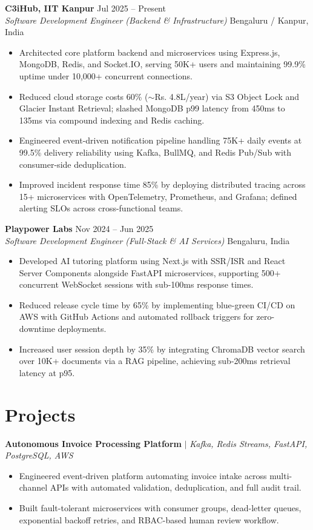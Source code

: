 \documentclass[10pt]{article}
\newcommand{\rItemList}{\begin{itemize}[leftmargin=1.1em, itemsep=0.8pt, topsep=0.8pt, parsep=0pt, label=\textbullet]}
\newcommand{\rEndItemList}{\end{itemize}}
\begin{document}
\textbf{C3iHub, IIT Kanpur} \hfill Jul 2025 -- Present \\
\textit{Software Development Engineer (Backend \& Infrastructure)} \hfill Bengaluru / Kanpur, India
\rItemList
\item Architected core platform backend and microservices using Express.js, MongoDB, Redis, and Socket.IO, serving 50K+ users and maintaining 99.9\% uptime under 10,000+ concurrent connections.
\item Reduced cloud storage costs 60\% ($\sim$Rs. 4.8L/year) via S3 Object Lock and Glacier Instant Retrieval; slashed MongoDB p99 latency from 450ms to 135ms via compound indexing and Redis caching.
\item Engineered event-driven notification pipeline handling 75K+ daily events at 99.5\% delivery reliability using Kafka, BullMQ, and Redis Pub/Sub with consumer-side deduplication.
\item Improved incident response time 85\% by deploying distributed tracing across 15+ microservices with OpenTelemetry, Prometheus, and Grafana; defined alerting SLOs across cross-functional teams.
\rEndItemList

\textbf{Playpower Labs} \hfill Nov 2024 -- Jun 2025 \\
\textit{Software Development Engineer (Full-Stack \& AI Services)} \hfill Bengaluru, India
\rItemList
\item Developed AI tutoring platform using Next.js with SSR/ISR and React Server Components alongside FastAPI microservices, supporting 500+ concurrent WebSocket sessions with sub-100ms response times.
\item Reduced release cycle time by 65\% by implementing blue-green CI/CD on AWS with GitHub Actions and automated rollback triggers for zero-downtime deployments.
\item Increased user session depth by 35\% by integrating ChromaDB vector search over 10K+ documents via a RAG pipeline, achieving sub-200ms retrieval latency at p95.
\rEndItemList

\section{Projects}

\textbf{Autonomous Invoice Processing Platform} $\vert$ \textit{Kafka, Redis Streams, FastAPI, PostgreSQL, AWS} \\
\rItemList
\item Engineered event-driven platform automating invoice intake across multi-channel APIs with automated validation, deduplication, and full audit trail.
\item Built fault-tolerant microservices with consumer groups, dead-letter queues, exponential backoff retries, and RBAC-based human review workflow.
\rEndItemList
\end{document}
